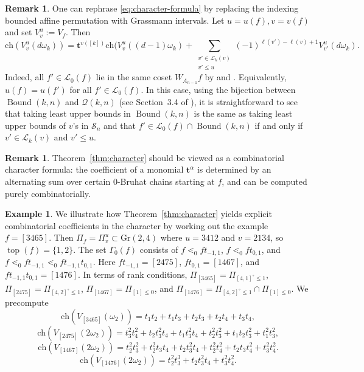 \documentclass[12pt,reqno]{amsart}
\theoremstyle{definition}
\newtheorem{example}[lemma]{Example}
\newtheorem{remark}[lemma]{Remark}
\newcommand{\ch}{\mathrm{ch}}
\newcommand{\symm}{\mathcal{S}}
\newcommand{\gr}{\mathrm{Gr}}
\newcommand{\topp}{\operatorname{top}}
\newcommand{\bound}{\operatorname{Bound}}
\newcommand{\Lenart}{\mathcal{L}}
\begin{document}
{\begin{remark}
One can rephrase \eqref{eq:character-formula} by replacing the indexing bounded affine permutation with Grassmann intervals.
Let $u = u(f), v = v(f)$ and set $V_v^u:= V_f$. Then
    \begin{equation}
\label{eq:character-formula-uv}
        \ch (V_v^u(d\omega_k))=\mathbf{t}^{v([k])}\ch (V_v^u((d-1)\omega_k)+\sum_{\substack{v'\in \Lenart_k(v)\\ v'\leq u}}(-1)^{\ell(v')-\ell(v)+1} V_{v'}^u(d\omega_k).
\end{equation}
Indeed, all $f'\in \Lenart_0(f)$ lie in the same coset $W_{A_{n-1}}f$ by  and . Equivalently, $u(f) = u(f')$ for all $f'\in \Lenart_0(f)$. In this case, using the bijection between $\bound(k,n)$ and $\mathcal{Q}(k,n)$ (see Section~3.4 of \cite{KLS13juggling}), it is straightforward to see that taking least upper bounds in $\bound(k,n)$ is the same as taking least upper bounds of $v$'s in $\symm_n$ and that $f'\in \Lenart_0(f)\cap \bound(k,n)$ if and only if $v'\in \Lenart_k(v)$ and $v'\leq u$. 
\end{remark}

\begin{remark}
Theorem~\ref{thm:character} should be viewed as a combinatorial character formula:
the coefficient of a monomial \(\mathbf t^\alpha\) is determined by an alternating sum over
certain \(0\)-Bruhat chains starting at \(f\), and can be computed purely combinatorially.
\end{remark}


\begin{example}
    \label{ex:char-formula}
    We illustrate how Theorem~\ref{thm:character} yields explicit combinatorial coefficients
in the character by working out the example \(f=[3465]\).
Then $\Pi_f=\Pi_v^u\subset \gr(2,4)$ where $u=3412$ and $v=2134$, so $\topp(f)=\{1,2\}$. The set $\Gamma_0(f)$ consists of 
    $f\lessdot_0 ft_{-1,1}$, $f\lessdot_0 ft_{0,1}$, and $f\lessdot_0 ft_{-1,1}\lessdot_0 ft_{-1,1}t_{0,1}$. Here $ft_{-1,1}=[2475]$, $ft_{0,1}=[1467]$, and $ft_{-1,1}t_{0,1}=[1476]$. 
    In terms of rank conditions, $\Pi_{[3465]}=\Pi_{[4,1]^\circ\le 1}$, $\Pi_{[2475]}=\Pi_{[4,2]^\circ\le 1}$, $\Pi_{[1467]}=\Pi_{[1]\le 0}$, and $\Pi_{[1476]}=\Pi_{[4,2]^\circ\le 1}\cap \Pi_{[1]\le 0}$.
    We precompute
    \[\ch(V_{[3465]}(\omega_2))=t_1t_2+t_1t_3+t_2t_3+t_2t_4+t_3t_4,\]
    \[\ch(V_{[2475]}(2\omega_2))=t_3^2t_4^2+t_2t_3^2t_4+t_1t_3^2t_4+t_2^2t_3^2+t_1t_2t_3^2+t_1^2t_3^2,\]
    \[\ch(V_{[1467]}(2\omega_2))=t_2^2t_3^2 +t_2^2t_3t_4+t_2t_3^2t_4+t_2^2t_4^2+t_2t_3t_4^2+t_3^2t_4^2.\]
    \[\ch(V_{[1476]}(2\omega_2))=t_2^2t_3^3+t_2t_3^2t_4+t_3^2t_4^2.\]


\end{example}}
\end{document}
